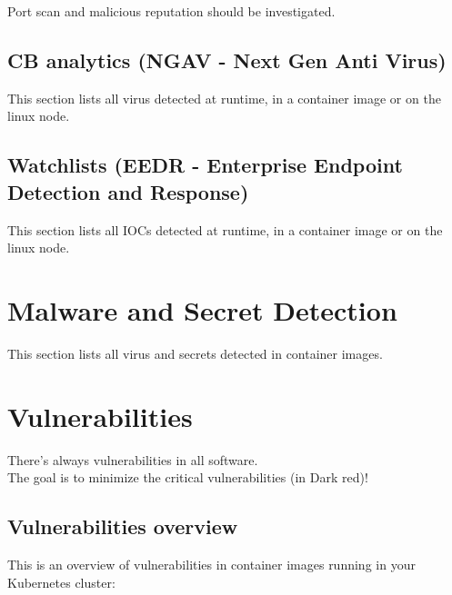 \begin{importantblock}
	Port scan and malicious reputation should be investigated.
\end{importantblock}

\vskip10pt


\vskip10pt


\subsection{CB analytics (NGAV - Next Gen Anti Virus)}
This section lists all virus detected at runtime, in a container image or on the linux node.

\subsection{Watchlists (EEDR - Enterprise Endpoint Detection and Response)}
This section lists all IOCs detected at runtime, in a container image or on the linux node.


\section{Malware and Secret Detection}
This section lists all virus and secrets detected in container images.



\section{Vulnerabilities}
There's always vulnerabilities in all software.\\
The goal is to minimize the critical vulnerabilities (in Dark red)!



\subsection{Vulnerabilities overview}
This is an overview of vulnerabilities in container images running in your Kubernetes cluster:

